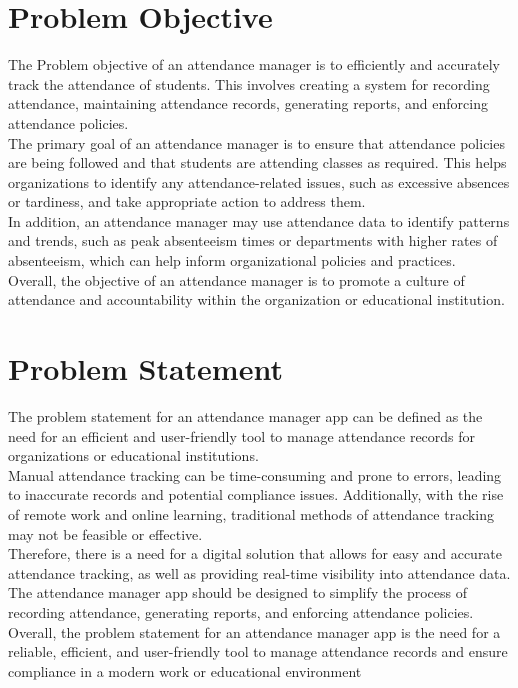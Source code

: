 \documentclass{article}
\begin{document}
\newpage
\section{Problem Objective}
\doublespacing
{\fontsize{14}{14}\selectfont The Problem objective of an attendance manager is to efficiently and accurately track the attendance of students. This involves creating a system for recording attendance, maintaining attendance records, generating reports, and enforcing attendance policies.\\

The primary goal of an attendance manager is to ensure that attendance policies are being followed and that students are attending classes as required. This helps organizations to identify any attendance-related issues, such as excessive absences or tardiness, and take appropriate action to address them.\\

In addition, an attendance manager may use attendance data to identify patterns and trends, such as peak absenteeism times or departments with higher rates of absenteeism, which can help inform organizational policies and practices.\\

Overall, the objective of an attendance manager is to promote a culture of attendance and accountability within the organization or educational institution.}

\newpage
\section{Problem Statement}
\doublespacing
{\fontsize{14}{14}\selectfont The problem statement for an attendance manager app can be defined as the need for an efficient and user-friendly tool to manage attendance records for organizations or educational institutions.\\

Manual attendance tracking can be time-consuming and prone to errors, leading to inaccurate records and potential compliance issues. Additionally, with the rise of remote work and online learning, traditional methods of attendance tracking may not be feasible or effective.\\

Therefore, there is a need for a digital solution that allows for easy and accurate attendance tracking, as well as providing real-time visibility into attendance data. The attendance manager app should be designed to simplify the process of recording attendance, generating reports, and enforcing attendance policies.\\

Overall, the problem statement for an attendance manager app is the need for a reliable, efficient, and user-friendly tool to manage attendance records and ensure compliance in a modern work or educational environment}
\end{document}

